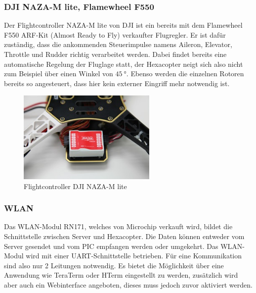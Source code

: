     \subsubsection{DJI NAZA-M lite, Flamewheel F550}
    Der Flightcontroller NAZA-M lite von DJI ist ein bereits mit dem Flamewheel F550 ARF-Kit (Almost Ready to Fly) verkaufter Flugregler.
    Er ist dafür zuständig, dass die ankommenden Steuerimpulse namens Aileron, Elevator, Throttle und Rudder richtig verarbeitet werden.
    Dabei findet bereits eine automatische Regelung der Fluglage statt, der Hexacopter neigt sich also nicht zum Beispiel über einen Winkel von $\SI{45}{\degree}$.
    Ebenso werden die einzelnen Rotoren bereits so angesteuert, dass hier kein externer Eingriff mehr notwendig ist.
    \begin{figure}[H]
      \begin{centering}
        \includegraphics[width = 0.6\textwidth]{Bilder/NAZA_M-lite}
      \par\end{centering}
      \caption[Flightcontroller DJI NAZA-M lite]{Flightcontroller DJI NAZA-M lite\cite{NAZA_M-lite}}
      \label{NAZA_M-lite}
    \end{figure}

    \subsubsection{WLAN}
    Das WLAN-Modul RN171, welches von Microchip verkauft wird, bildet die Schnittstelle zwischen Server und Hexacopter. Die Daten können entweder vom Server gesendet
    und vom PIC empfangen werden oder umgekehrt.
    Das WLAN-Modul wird mit einer UART-Schnittstelle betrieben. Für eine Kommunikation sind also nur 2 Leitungen notwendig.
    Es bietet die Möglichkeit über eine Anwendung wie TeraTerm oder HTerm eingestellt zu werden, zusätzlich wird aber auch ein Webinterface angeboten, dieses muss jedoch zuvor
    aktiviert werden.

